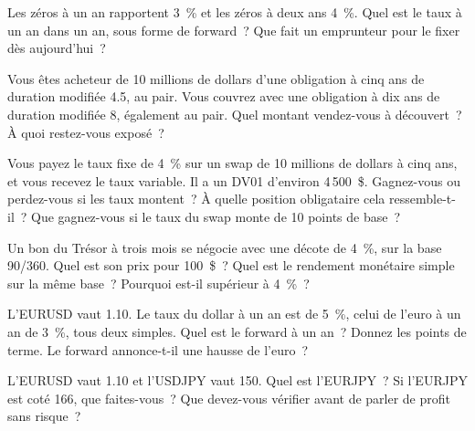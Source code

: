 \begin{question}\label{iq:iv2:rates-and-fx:5}
Les zéros à un an rapportent 3~\% et les zéros à deux ans 4~\%. Quel est le taux à un an dans un an, sous forme de forward~? Que fait un emprunteur pour le fixer dès aujourd'hui~?
\end{question}

\begin{question}\label{iq:iv2:rates-and-fx:6}
Vous êtes acheteur de 10 millions de dollars d'une obligation à cinq ans de duration modifiée 4.5, au pair. Vous couvrez avec une obligation à dix ans de duration modifiée 8, également au pair. Quel montant vendez-vous à découvert~? À quoi restez-vous exposé~?
\end{question}

\begin{question}\label{iq:iv2:rates-and-fx:7}
Vous payez le taux fixe de 4~\% sur un swap de 10 millions de dollars à cinq ans, et vous recevez le taux variable. Il a un DV01 d'environ 4\,500~\$. Gagnez-vous ou perdez-vous si les taux montent~? À quelle position obligataire cela ressemble-t-il~? Que gagnez-vous si le taux du swap monte de 10 points de base~?
\end{question}

\begin{question}\label{iq:iv2:rates-and-fx:8}
Un bon du Trésor à trois mois se négocie avec une décote de 4~\%, sur la base 90/360. Quel est son prix pour 100~\$~? Quel est le rendement monétaire simple sur la même base~? Pourquoi est-il supérieur à 4~\%~?
\end{question}

\begin{question}\label{iq:iv2:rates-and-fx:9}
L'EURUSD vaut 1.10. Le taux du dollar à un an est de 5~\%, celui de l'euro à un an de 3~\%, tous deux simples. Quel est le forward à un an~? Donnez les points de terme. Le forward annonce-t-il une hausse de l'euro~?
\end{question}

\begin{question}\label{iq:iv2:rates-and-fx:10}
L'EURUSD vaut 1.10 et l'USDJPY vaut 150. Quel est l'EURJPY~? Si l'EURJPY est coté 166, que faites-vous~? Que devez-vous vérifier avant de parler de profit sans risque~?
\end{question}

